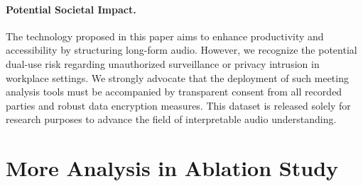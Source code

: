 \documentclass[11pt]{article}
\begin{document}
\paragraph{Potential Societal Impact.}
The technology proposed in this paper aims to enhance productivity and accessibility by structuring long-form audio. However, we recognize the potential dual-use risk regarding unauthorized surveillance or privacy intrusion in workplace settings. We strongly advocate that the deployment of such meeting analysis tools must be accompanied by transparent consent from all recorded parties and robust data encryption measures. This dataset is released solely for research purposes to advance the field of interpretable audio understanding.


\newpage


\newpage
\appendix


\section{More Analysis in Ablation Study}
\end{document}

